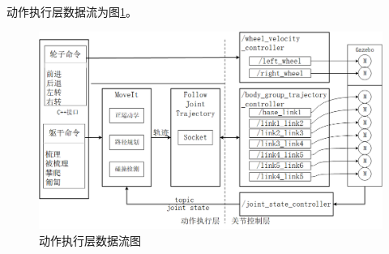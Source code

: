 

动作执行层数据流为图\ref{figure_doactlayer}。
\begin{figure}[htb]
  \centering
  \includegraphics[width=0.6\linewidth]{images/ch03/doactlayer.png}
  \caption{动作执行层数据流图}\label{figure_doactlayer}
\end{figure}
